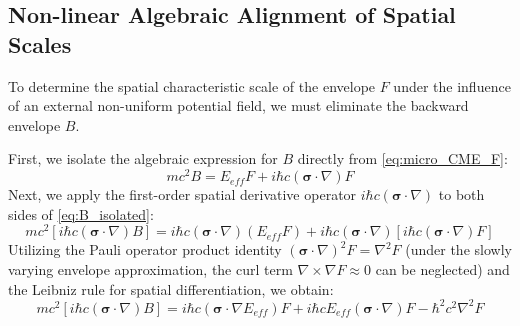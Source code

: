 \documentclass[12pt, a4paper]{article}
\begin{document}
\subsection{Non-linear Algebraic Alignment of Spatial Scales}

To determine the spatial characteristic scale of the envelope $F$ under the influence of an external non-uniform potential field, we must eliminate the backward envelope $B$.

First, we isolate the algebraic expression for $B$ directly from \eqref{eq:micro_CME_F}:
\begin{equation}
    mc^2 B = E_{eff} F + i\hbar c (\boldsymbol{\sigma} \cdot \nabla) F \label{eq:B_isolated}
\end{equation}
Next, we apply the first-order spatial derivative operator $i\hbar c (\boldsymbol{\sigma} \cdot \nabla)$ to both sides of \eqref{eq:B_isolated}:
\begin{equation}
    mc^2 [i\hbar c (\boldsymbol{\sigma} \cdot \nabla) B] = i\hbar c (\boldsymbol{\sigma} \cdot \nabla) (E_{eff} F) + i\hbar c (\boldsymbol{\sigma} \cdot \nabla) [i\hbar c (\boldsymbol{\sigma} \cdot \nabla) F]
\end{equation}
Utilizing the Pauli operator product identity $(\boldsymbol{\sigma} \cdot \nabla)^2 F = \nabla^2 F$ (under the slowly varying envelope approximation, the curl term $\nabla \times \nabla F \approx 0$ can be neglected) and the Leibniz rule for spatial differentiation, we obtain:
\begin{equation}
    mc^2 [i\hbar c (\boldsymbol{\sigma} \cdot \nabla) B] = i\hbar c (\boldsymbol{\sigma} \cdot \nabla E_{eff}) F + i\hbar c E_{eff} (\boldsymbol{\sigma} \cdot \nabla) F - \hbar^2 c^2 \nabla^2 F \label{eq:grad_B_term}
\end{equation}
\end{document}
